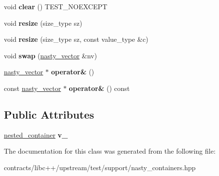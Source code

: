 \begin{DoxyCompactItemize}
\item 
\mbox{\label{classnasty__vector_a3743a3d3963430eaeebc373ab5b743af}} 
void {\bfseries clear} () T\+E\+S\+T\+\_\+\+N\+O\+E\+X\+C\+E\+PT
\item 
\mbox{\label{classnasty__vector_a85a28a4f6531a42abf0291be07a8fc59}} 
void {\bfseries resize} (size\+\_\+type sz)
\item 
\mbox{\label{classnasty__vector_a268635b64649292b4bba574afdb6d9cc}} 
void {\bfseries resize} (size\+\_\+type sz, const value\+\_\+type \&c)
\item 
\mbox{\label{classnasty__vector_a1244877ef466fda2bcc1199f7a8dadf2}} 
void {\bfseries swap} (\mbox{\hyperlink{classnasty__vector}{nasty\+\_\+vector}} \&nv)
\item 
\mbox{\label{classnasty__vector_a91a5511dbea1e41ffd98cc9aa74f1355}} 
\mbox{\hyperlink{classnasty__vector}{nasty\+\_\+vector}} $\ast$ {\bfseries operator\&} ()
\item 
\mbox{\label{classnasty__vector_a66bbb3dec9faa16166fe516646c4719d}} 
const \mbox{\hyperlink{classnasty__vector}{nasty\+\_\+vector}} $\ast$ {\bfseries operator\&} () const
\end{DoxyCompactItemize}
\subsection*{Public Attributes}
\begin{DoxyCompactItemize}
\item 
\mbox{\label{classnasty__vector_ae220ecf0c1b55a95abdbad86bc64adcc}} 
\mbox{\hyperlink{classstd_1_1vector}{nested\+\_\+container}} {\bfseries v\+\_\+}
\end{DoxyCompactItemize}


The documentation for this class was generated from the following file\+:\begin{DoxyCompactItemize}
\item 
contracts/libc++/upstream/test/support/nasty\+\_\+containers.\+hpp\end{DoxyCompactItemize}
